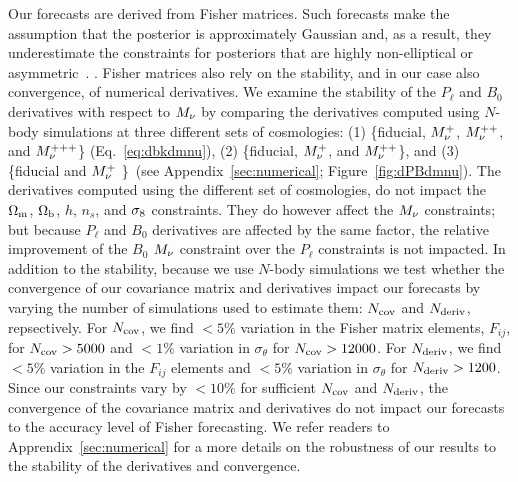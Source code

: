 Our forecasts are derived from Fisher matrices. Such forecasts make 
the assumption that the posterior is approximately Gaussian and, as a result, 
they underestimate the constraints for posteriors that are highly 
non-elliptical or asymmetric~\citep{wolz2012}. 
. 
Fisher matrices also rely 
on the stability, and in our case also convergence, of numerical derivatives. 
We examine the stability of the $P_\ell$ and $B_0$ derivatives with respect 
to $M_\nu$ by comparing the derivatives computed using $N$-body simulations 
at three different sets of cosmologies: (1) \{fiducial, $M_\nu^{+}$, $M_\nu^{++}$, 
and $M_\nu^{+++}$\} (Eq.~\ref{eq:dbkdmnu}), (2) \{fiducial, $M_\nu^{+}$, 
and $M_\nu^{++}$\}, and (3) \{fiducial and $M_\nu^{+}$ \}~(see Appendix~\ref{sec:numerical}; Figure~\ref{fig:dPBdmnu}). 
The derivatives computed using the different set of cosmologies, do not impact 
the $\Omega_{\rm m}$, $\Omega_{\rm b}$, $h$, $n_s$, and $\sigma_8$ constraints. They do however affect the 
$M_\nu$ constraints; but because $P_\ell$ and $B_0$ derivatives are affected by 
the same factor, the relative improvement of the $B_0$ $M_\nu$ constraint over 
the $P_\ell$ constraints is not impacted. 
In addition to the stability, because we use $N$-body simulations we test 
whether the convergence of our covariance matrix and derivatives impact 
our forecasts by varying the number of simulations 
used to estimate them: $N_{\rm cov}$ and $N_{\rm deriv}$, repsectively. 
For $N_{\rm cov}$, we find $< 5\%$ variation in the Fisher matrix elements, 
$F_{ij}$, for $N_{\rm cov} > 5000$ and $< 1\%$ variation in $\sigma_\theta$
for $N_{\rm cov} > 12000$.  For $N_{\rm deriv}$, we find $< 5\%$ variation 
in the $F_{ij}$ elements and $< 5\%$ variation in $\sigma_\theta$ for 
$N_{\rm deriv} > 1200$. Since our constraints vary by $< 10\%$ for sufficient 
$N_{\rm cov}$ and $N_{\rm deriv}$, the convergence of the covariance matrix 
and derivatives do not impact our forecasts to the accuracy level of Fisher 
forecasting. We refer readers to Apprendix~\ref{sec:numerical} for a more 
details on the robustness of our results to the stability of the derivatives 
and convergence. 

